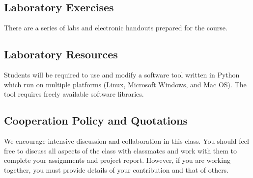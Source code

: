 \documentclass[11pt,a4paper]{article}
\begin{document}
\subsection{Laboratory Exercises} 
There are a series of labs and electronic handouts prepared for the course.

\subsection{Laboratory Resources}
Students will be required to use and modify a software tool written in Python which run on multiple platforms (Linux, Microsoft Windows, and Mac OS). The tool requires freely available software libraries.

\subsection{Cooperation Policy and Quotations}
We encourage intensive discussion and collaboration in this class. You should feel free to discuss all aspects of the class with classmates and work with them to complete your assignments and project report. However, if you are working together, you must provide details of your contribution and that of others.
\end{document}
